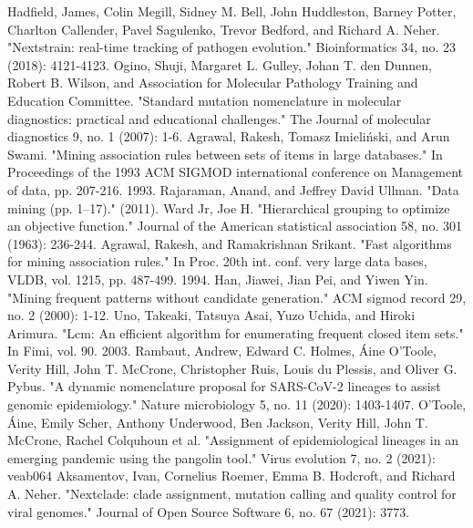 \documentclass[twoside,twocolumn]{article}
\begin{document}
	\begin{thebibliography}{99} 
		Hadfield, James, Colin Megill, Sidney M. Bell, John Huddleston, Barney Potter, Charlton Callender, Pavel Sagulenko, Trevor Bedford, and Richard A. Neher. "Nextstrain: real-time tracking of pathogen evolution." Bioinformatics 34, no. 23 (2018): 4121-4123.
		Ogino, Shuji, Margaret L. Gulley, Johan T. den Dunnen, Robert B. Wilson, and Association for Molecular Pathology Training and Education Committee. "Standard mutation nomenclature in molecular diagnostics: practical and educational challenges." The Journal of molecular diagnostics 9, no. 1 (2007): 1-6.
		Agrawal, Rakesh, Tomasz Imieliński, and Arun Swami. "Mining association rules between sets of items in large databases." In Proceedings of the 1993 ACM SIGMOD international conference on Management of data, pp. 207-216. 1993.
		Rajaraman, Anand, and Jeffrey David Ullman. "Data mining (pp. 1–17)." (2011).
		Ward Jr, Joe H. "Hierarchical grouping to optimize an objective function." Journal of the American statistical association 58, no. 301 (1963): 236-244.
		Agrawal, Rakesh, and Ramakrishnan Srikant. "Fast algorithms for mining association rules." In Proc. 20th int. conf. very large data bases, VLDB, vol. 1215, pp. 487-499. 1994.
		Han, Jiawei, Jian Pei, and Yiwen Yin. "Mining frequent patterns without candidate generation." ACM sigmod record 29, no. 2 (2000): 1-12.
		Uno, Takeaki, Tatsuya Asai, Yuzo Uchida, and Hiroki Arimura. "Lcm: An efficient algorithm for enumerating frequent closed item sets." In Fimi, vol. 90. 2003.
		Rambaut, Andrew, Edward C. Holmes, Áine O’Toole, Verity Hill, John T. McCrone, Christopher Ruis, Louis du Plessis, and Oliver G. Pybus. "A dynamic nomenclature proposal for SARS-CoV-2 lineages to assist genomic epidemiology." Nature microbiology 5, no. 11 (2020): 1403-1407.
		O’Toole, Áine, Emily Scher, Anthony Underwood, Ben Jackson, Verity Hill, John T. McCrone, Rachel Colquhoun et al. "Assignment of epidemiological lineages in an emerging pandemic using the pangolin tool." Virus evolution 7, no. 2 (2021): veab064
		Aksamentov, Ivan, Cornelius Roemer, Emma B. Hodcroft, and Richard A. Neher. "Nextclade: clade assignment, mutation calling and quality control for viral genomes." Journal of Open Source Software 6, no. 67 (2021): 3773.
	
	\end{thebibliography}
	
	
\end{document}
